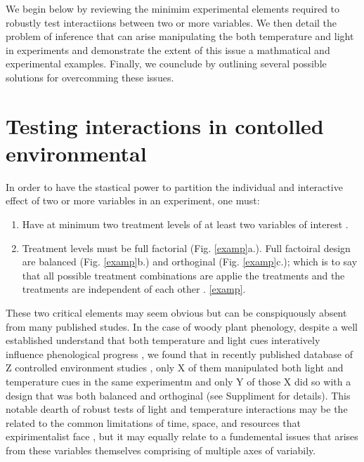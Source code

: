 \documentclass[11pt]{article}
\begin{document}
We begin below by reviewing the minimim experimental elements required to robustly test interactiions between two or more variables. We then detail the problem of inference that can arise manipulating the both temperature and light in experiments and demonstrate the extent of this issue a mathmatical and experimental examples. Finally, we counclude by outlining several possible solutions for overcomming these issues. 

\section{Testing interactions in contolled environmental}
In order to have the stastical power to partition the individual and interactive effect of two or more variables in an experiment, one must:\\
\begin{enumerate}
\item Have at minimum two treatment levels of at least two variables of interest \citep{}.
\item Treatment levels must be full factorial (Fig. \ref{examp}a.). Full factoiral design are balanced (Fig. \ref{examp}b.)  and orthoginal (Fig. \ref{examp}c.); which is to say that all possible treatment combinations are applie the treatments and the treatments are independent of each other \citep{}.   \ref{examp}.
\end{enumerate}

These two critical elements may seem obvious but can be conspiquously absent from many published studes. In the case of woody plant phenology, despite a well established understand that both temperature and light cues interatively influence phenological progress \citep{}, we found that in recently published database of Z  controlled environment studies \citep{}, only X of them manipulated both light and temperature cues in the same experimentm and only Y of those X did so with a design that was both balanced and orthoginal (see Suppliment for details). This notable dearth of robust tests of light and temperature interactions may be the related to the common limitations of time, space, and resources that expirimentalist face \citep{}, but it may equally relate to a fundemental issues that arises from these variables themselves comprising of multiple axes of variabily.
\end{document}
